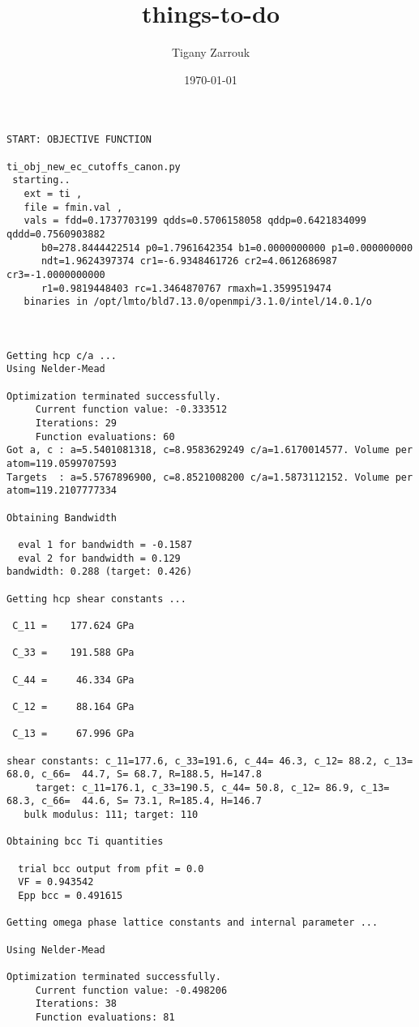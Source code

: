 \documentclass[11pt]{article}
\author{Tigany Zarrouk}
\date{\today}
\title{things-to-do}
\begin{document}
\maketitle
\tableofcontents

\begin{verbatim}
START: OBJECTIVE FUNCTION

ti_obj_new_ec_cutoffs_canon.py 
 starting..
   ext = ti ,
   file = fmin.val ,
   vals = fdd=0.1737703199 qdds=0.5706158058 qddp=0.6421834099 qddd=0.7560903882 
	  b0=278.8444422514 p0=1.7961642354 b1=0.0000000000 p1=0.000000000
	  ndt=1.9624397374 cr1=-6.9348461726 cr2=4.0612686987 cr3=-1.0000000000
	  r1=0.9819448403 rc=1.3464870767 rmaxh=1.3599519474  
   binaries in /opt/lmto/bld7.13.0/openmpi/3.1.0/intel/14.0.1/o



Getting hcp c/a ...
Using Nelder-Mead

Optimization terminated successfully.
	 Current function value: -0.333512
	 Iterations: 29
	 Function evaluations: 60
Got a, c : a=5.5401081318, c=8.9583629249 c/a=1.6170014577. Volume per atom=119.0599707593
Targets  : a=5.5767896900, c=8.8521008200 c/a=1.5873112152. Volume per atom=119.2107777334

Obtaining Bandwidth 

  eval 1 for bandwidth = -0.1587
  eval 2 for bandwidth = 0.129
bandwidth: 0.288 (target: 0.426)

Getting hcp shear constants ...

 C_11 =    177.624 GPa

 C_33 =    191.588 GPa

 C_44 =     46.334 GPa

 C_12 =     88.164 GPa

 C_13 =     67.996 GPa

shear constants: c_11=177.6, c_33=191.6, c_44= 46.3, c_12= 88.2, c_13= 68.0, c_66=  44.7, S= 68.7, R=188.5, H=147.8 
	 target: c_11=176.1, c_33=190.5, c_44= 50.8, c_12= 86.9, c_13= 68.3, c_66=  44.6, S= 73.1, R=185.4, H=146.7 
   bulk modulus: 111; target: 110 

Obtaining bcc Ti quantities

  trial bcc output from pfit = 0.0
  VF = 0.943542
  Epp bcc = 0.491615

Getting omega phase lattice constants and internal parameter ...

Using Nelder-Mead

Optimization terminated successfully.
	 Current function value: -0.498206
	 Iterations: 38
	 Function evaluations: 81


\end{verbatim}
\end{document}
